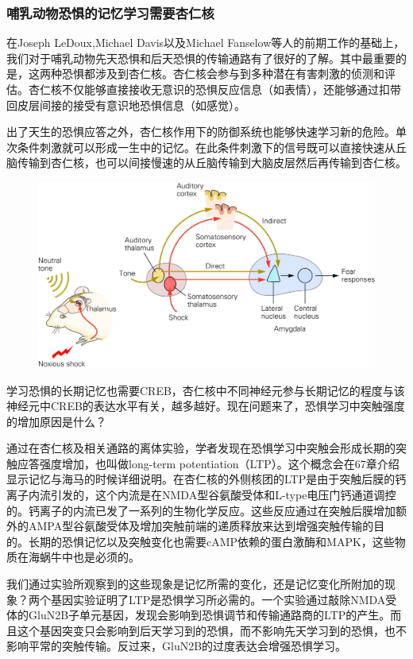 \documentclass[UTF8,nofonts]{ctexart}
\begin{document}
\subsubsection{哺乳动物恐惧的记忆学习需要杏仁核}
在Joseph LeDoux,Michael Davis以及Michael Fanselow等人的前期工作的基础上，我们对于哺乳动物先天恐惧和后天恐惧的传输通路有了很好的了解。其中最重要的是，这两种恐惧都涉及到杏仁核。杏仁核会参与到多种潜在有害刺激的侦测和评估。杏仁核不仅能够直接接收无意识的恐惧反应信息（如表情），还能够通过扣带回皮层间接的接受有意识地恐惧信息（如感觉）。
\par
出了天生的恐惧应答之外，杏仁核作用下的防御系统也能够快速学习新的危险。单次条件刺激就可以形成一生中的记忆。在此条件刺激下的信号既可以直接快速从丘脑传输到杏仁核，也可以间接慢速的从丘脑传输到大脑皮层然后再传输到杏仁核。
\begin{figure}
	\centering
	\includegraphics[scale=0.9]{Pic/6612_PNS5.jpg}
\end{figure}
学习恐惧的长期记忆也需要CREB，杏仁核中不同神经元参与长期记忆的程度与该神经元中CREB的表达水平有关，越多越好。现在问题来了，恐惧学习中突触强度的增加原因是什么？
\par
通过在杏仁核及相关通路的离体实验，学者发现在恐惧学习中突触会形成长期的突触应答强度增加，也叫做long-term potentiation（LTP）。这个概念会在67章介绍显示记忆与海马的时候详细说明。在杏仁核的外侧核团的LTP是由于突触后膜的钙离子内流引发的，这个内流是在NMDA型谷氨酸受体和L-type电压门钙通道调控的。钙离子的内流已发了一系列的生物化学反应。这些反应通过在突触后膜增加额外的AMPA型谷氨酸受体及增加突触前端的递质释放来达到增强突触传输的目的。长期的恐惧记忆以及突触变化也需要cAMP依赖的蛋白激酶和MAPK，这些物质在海蜗牛中也是必须的。
\par
我们通过实验所观察到的这些现象是记忆所需的变化，还是记忆变化所附加的现象？两个基因实验证明了LTP是恐惧学习所必需的。一个实验通过敲除NMDA受体的GluN2B子单元基因，发现会影响到恐惧调节和传输通路商的LTP的产生。而且这个基因突变只会影响到后天学习到的恐惧，而不影响先天学习到的恐惧，也不影响平常的突触传输。反过来，GluN2B的过度表达会增强恐惧学习。
\end{document}
